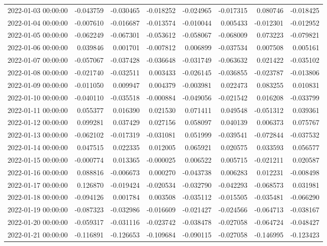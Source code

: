 \begin{tabular}{lrrrrrrr}
2022-01-03 00:00:00 & -0.043759 & -0.030465 & -0.018252 & -0.024965 & -0.017315 & 0.080746 & -0.018425 \\
2022-01-04 00:00:00 & -0.007610 & -0.016687 & -0.013574 & -0.010044 & 0.005433 & -0.012301 & -0.012952 \\
2022-01-05 00:00:00 & -0.062249 & -0.067301 & -0.053612 & -0.058067 & -0.068009 & 0.073223 & -0.079821 \\
2022-01-06 00:00:00 & 0.039846 & 0.001701 & -0.007812 & 0.006899 & -0.037534 & 0.007508 & 0.005161 \\
2022-01-07 00:00:00 & -0.057067 & -0.037428 & -0.036648 & -0.031749 & -0.063632 & 0.021422 & -0.035102 \\
2022-01-08 00:00:00 & -0.021740 & -0.032511 & 0.003433 & -0.026145 & -0.036855 & -0.023787 & -0.013806 \\
2022-01-09 00:00:00 & -0.011050 & 0.009947 & 0.004379 & -0.003981 & 0.022473 & 0.083255 & 0.010831 \\
2022-01-10 00:00:00 & -0.040110 & -0.035518 & -0.000884 & -0.049056 & -0.021542 & 0.016208 & -0.033799 \\
2022-01-11 00:00:00 & 0.055377 & 0.016390 & 0.021530 & 0.071411 & 0.049548 & -0.051312 & 0.039361 \\
2022-01-12 00:00:00 & 0.099281 & 0.037429 & 0.027156 & 0.058097 & 0.040139 & 0.006373 & 0.075767 \\
2022-01-13 00:00:00 & -0.062102 & -0.017319 & -0.031081 & 0.051999 & -0.039541 & -0.072844 & -0.037532 \\
2022-01-14 00:00:00 & 0.047515 & 0.022335 & 0.012005 & 0.065921 & 0.020575 & 0.033593 & 0.056577 \\
2022-01-15 00:00:00 & -0.000774 & 0.013365 & -0.000025 & 0.006522 & 0.005715 & -0.021211 & 0.020587 \\
2022-01-16 00:00:00 & 0.088816 & -0.006673 & 0.000270 & -0.043738 & 0.006283 & 0.012231 & -0.008498 \\
2022-01-17 00:00:00 & 0.126870 & -0.019424 & -0.020534 & -0.032790 & -0.042293 & -0.068573 & 0.031981 \\
2022-01-18 00:00:00 & -0.094126 & 0.001784 & 0.003508 & -0.035112 & -0.015505 & -0.035481 & -0.066290 \\
2022-01-19 00:00:00 & -0.087323 & -0.032986 & -0.016609 & -0.021427 & -0.024566 & -0.064713 & -0.038167 \\
2022-01-20 00:00:00 & -0.059317 & -0.031116 & -0.023742 & -0.038478 & -0.027058 & -0.064724 & -0.048427 \\
2022-01-21 00:00:00 & -0.116891 & -0.126653 & -0.109684 & -0.090115 & -0.027058 & -0.146995 & -0.123423 \\

\end{tabular}
